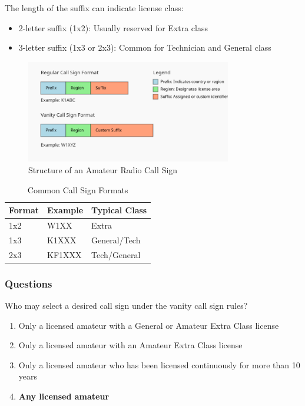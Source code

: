 The length of the suffix can indicate license class:
\begin{itemize}[noitemsep]    \item 2-letter suffix (1x2): Usually reserved for Extra class
    \item 3-letter suffix (1x3 or 2x3): Common for Technician and General class
\end{itemize}

\begin{figure}[h]
    \centering
    \includegraphics[width=0.8\textwidth]{tech/images/call-sign-structure.png}
    \caption{Structure of an Amateur Radio Call Sign}
    \label{fig:call-sign-structure}
\end{figure}

\begin{table}[h]
    \centering
    \begin{tabular}{|l|l|l|}
        \hline
        \textbf{Format} & \textbf{Example} & \textbf{Typical Class} \\
        \hline
        1x2 & W1XX & Extra \\
        1x3 & K1XXX & General/Tech \\
        2x3 & KF1XXX & Tech/General \\
        \hline
    \end{tabular}
    \caption{Common Call Sign Formats}
    \label{tab:call-sign-formats}
\end{table}

\subsubsection*{Questions}

\begin{tcolorbox}[colback=gray!10!white,colframe=black!75!black,title={T1C02}]
    Who may select a desired call sign under the vanity call sign rules?
    \begin{enumerate}[label=\Alph*),noitemsep]
        \item Only a licensed amateur with a General or Amateur Extra Class license
        \item Only a licensed amateur with an Amateur Extra Class license
        \item Only a licensed amateur who has been licensed continuously for more than 10 years
        \item \textbf{Any licensed amateur}
    \end{enumerate}
\end{tcolorbox}

